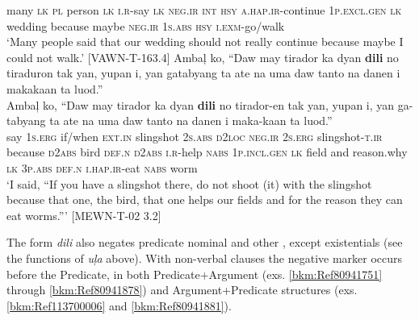 many  \textsc{lk}  \textsc{pl}  person  \textsc{lk}  \textsc{i.r}-say  \textsc{lk}  \textsc{neg.ir}  \textsc{int}  \textsc{hsy}  \textsc{a.hap.ir}-continue
1\textsc{p.excl.gen}  \textsc{lk}  wedding  because  maybe  \textsc{neg.ir}  1\textsc{s.abs}  \textsc{hsy}  \textsc{i.exm}-go/walk \\
\glt `Many people said that our wedding should not really continue because maybe I could not walk.’ [VAWN-T-163.4]
\z
\ea
\label{bkm:Ref446617639}
Ambaļ  ko,  “Daw  may  tirador  ka  dyan  \textbf{dili}  no  tiraduron tak  yan,  yupan  i,  yan  gatabyang  ta  ate  na  uma  daw tanto  na  danen  i  makakaan  ta  luod.” \\\smallskip
\gll Ambaļ  ko,  “Daw  may  tirador  ka  dyan  \textbf{dili}  no  tirador-en tak  yan,  yupan  i,  yan  ga-tabyang  ta  ate  na  uma  daw tanto  na  danen  i  maka-kaan  ta  luod.” \\
say  1\textsc{s.erg}  if/when  \textsc{ext.in}  slingshot  2\textsc{s.abs}  \textsc{d}2\textsc{loc}  \textsc{neg.ir}  2\textsc{s.erg}  slingshot-\textsc{t.ir}
because  \textsc{d}2\textsc{abs}  bird  \textsc{def.n}  \textsc{d}2\textsc{abs}  \textsc{i.r}-help  \textsc{nabs}  1\textsc{p.incl.gen}  \textsc{lk}  field  and reason.why  \textsc{lk}  3\textsc{p.abs}  \textsc{def.n}  \textsc{i.hap.ir}-eat  \textsc{nabs}  worm \\
\glt `I said, “If you have a slingshot there, do not shoot (it) with the slingshot because that one, the bird, that one helps our fields and for the reason they can eat worms.”' [MEWN-T-02 3.2]
\z

The form \textit{dili} also negates predicate nominal and other , except existentials (see the functions of \textit{uļa} above). With non-verbal clauses the negative marker occurs before the Predicate, in both Predicate+Argument (exs. \ref{bkm:Ref80941751} through \ref{bkm:Ref80941878}) and Argument+Predicate structures (exs. \ref{bkm:Ref113700006} and \ref{bkm:Ref80941881}).

